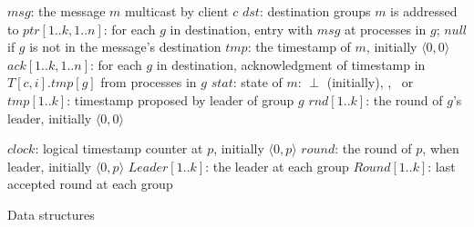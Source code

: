 
\begin{algorithm}
\footnotesize

\begin{distribalgo}[1]

\vspace{1.0mm}
	\STATE $msg$: the message $m$ multicast by client $c$
	\STATE $dst$: destination groups $m$ is addressed to
	\STATE $ptr[1..k,1..n]$: for each $g$ in destination, entry with $msg$ at processes in $g$; $null$ if $g$ is not in the message's destination
	\STATE $tmp$: the timestamp of $m$, initially $\langle 0,0 \rangle$
	\STATE $ack[1..k,1..n]$: for each $g$ in destination, acknowledgment of timestamp in $T[c,i].tmp[g]$ from processes in $g$
	\STATE $stat$: state of $m$: $\perp$ (initially), \mcast, \ordered\ or \done
\ENDINDENT
\vspace{1.0mm}
	\STATE $tmp[1..k]$: timestamp proposed by leader of group $g$
	\STATE $rnd[1..k]$: the round of $g$'s leader, initially $\langle 0,0 \rangle$
\ENDINDENT
\vspace{1.0mm}
\vspace{1.0mm}

	\STATE $clock$: logical timestamp counter at $p$, initially $\langle 0,p \rangle$
	\STATE $round$: the round of $p$, when leader, initially $\langle 0,p \rangle$
	\STATE $Leader[1..k]$: the leader at each group
	\STATE $Round[1..k]$: last accepted round at each group
\ENDINDENT

\vspace{2.0mm}

%


\caption{Data structures}
\label{alg:data_struct}
\end{distribalgo}
\end{algorithm}

